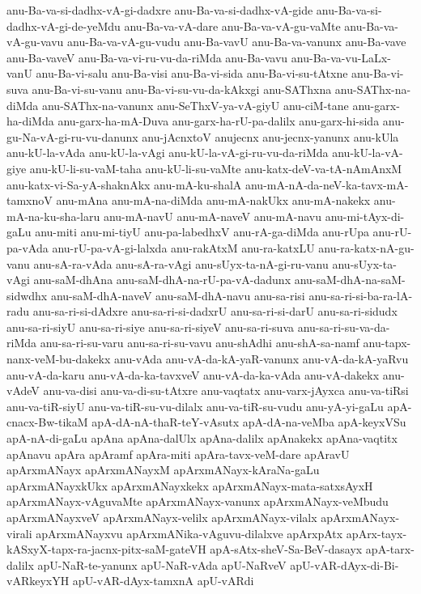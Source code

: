 {anu-Ba-va-si-dadhx-vA-gi-dadxre
anu-Ba-va-si-dadhx-vA-gide
anu-Ba-va-si-dadhx-vA-gi-de-yeMdu
anu-Ba-va-vA-dare
anu-Ba-va-vA-gu-vaMte
anu-Ba-va-vA-gu-vavu
anu-Ba-va-vA-gu-vudu
anu-Ba-vavU
anu-Ba-va-vanunx
anu-Ba-vave
anu-Ba-vaveV
anu-Ba-va-vi-ru-vu-da-riMda
anu-Ba-vavu
anu-Ba-va-vu-LaLx-vanU
anu-Ba-vi-salu
anu-Ba-visi
anu-Ba-vi-sida
anu-Ba-vi-su-tAtxne
anu-Ba-vi-suva
anu-Ba-vi-su-vanu
anu-Ba-vi-su-vu-da-kAkxgi
anu-SAThxna
anu-SAThx-na-diMda
anu-SAThx-na-vanunx
anu-SeThxV-ya-vA-giyU
anu-ciM-tane
anu-garx-ha-diMda
anu-garx-ha-mA-Duva
anu-garx-ha-rU-pa-dalilx
anu-garx-hi-sida
anu-gu-Na-vA-gi-ru-vu-danunx
anu-jAcnxtoV
anujecnx
anu-jecnx-yanunx
anu-kUla
anu-kU-la-vAda
anu-kU-la-vAgi
anu-kU-la-vA-gi-ru-vu-da-riMda
anu-kU-la-vA-giye
anu-kU-li-su-vaM-taha
anu-kU-li-su-vaMte
anu-katx-deV-va-tA-nAmAnxM
anu-katx-vi-Sa-yA-shaknAkx
anu-mA-ku-shalA
anu-mA-nA-da-neV-ka-tavx-mA-tamxnoV
anu-mAna
anu-mA-na-diMda
anu-mA-nakUkx
anu-mA-nakekx
anu-mA-na-ku-sha-laru
anu-mA-navU
anu-mA-naveV
anu-mA-navu
anu-mi-tAyx-di-gaLu
anu-miti
anu-mi-tiyU
anu-pa-labedhxV
anu-rA-ga-diMda
anu-rUpa
anu-rU-pa-vAda
anu-rU-pa-vA-gi-lalxda
anu-rakAtxM
anu-ra-katxLU
anu-ra-katx-nA-gu-vanu
anu-sA-ra-vAda
anu-sA-ra-vAgi
anu-sUyx-ta-nA-gi-ru-vanu
anu-sUyx-ta-vAgi
anu-saM-dhAna
anu-saM-dhA-na-rU-pa-vA-dadunx
anu-saM-dhA-na-saM-sidwdhx
anu-saM-dhA-naveV
anu-saM-dhA-navu
anu-sa-risi
anu-sa-ri-si-ba-ra-lA-radu
anu-sa-ri-si-dAdxre
anu-sa-ri-si-dadxrU
anu-sa-ri-si-darU
anu-sa-ri-sidudx
anu-sa-ri-siyU
anu-sa-ri-siye
anu-sa-ri-siyeV
anu-sa-ri-suva
anu-sa-ri-su-va-da-riMda
anu-sa-ri-su-varu
anu-sa-ri-su-vavu
anu-shAdhi
anu-shA-sa-namf
anu-tapx-nanx-veM-bu-dakekx
anu-vAda
anu-vA-da-kA-yaR-vanunx
anu-vA-da-kA-yaRvu
anu-vA-da-karu
anu-vA-da-ka-tavxveV
anu-vA-da-ka-vAda
anu-vA-dakekx
anu-vAdeV
anu-va-disi
anu-va-di-su-tAtxre
anu-vaqtatx
anu-varx-jAyxca
anu-va-tiRsi
anu-va-tiR-siyU
anu-va-tiR-su-vu-dilalx
anu-va-tiR-su-vudu
anu-yA-yi-gaLu
apA-cnacx-Bw-tikaM
apA-dA-nA-thaR-teY-vAsutx
apA-dA-na-veMba
apA-keyxVSu
apA-nA-di-gaLu
apAna
apAna-dalUlx
apAna-dalilx
apAnakekx
apAna-vaqtitx
apAnavu
apAra
apAramf
apAra-miti
apAra-tavx-veM-dare
apAravU
apArxmANayx
apArxmANayxM
apArxmANayx-kAraNa-gaLu
apArxmANayxkUkx
apArxmANayxkekx
apArxmANayx-mata-satxsAyxH
apArxmANayx-vAguvaMte
apArxmANayx-vanunx
apArxmANayx-veMbudu
apArxmANayxveV
apArxmANayx-velilx
apArxmANayx-vilalx
apArxmANayx-virali
apArxmANayxvu
apArxmANika-vAguvu-dilalxve
apArxpAtx
apArx-tayx-kASxyX-tapx-ra-jacnx-pitx-saM-gateVH
apA-sAtx-sheV-Sa-BeV-dasayx
apA-tarx-dalilx
apU-NaR-te-yanunx
apU-NaR-vAda
apU-NaRveV
apU-vAR-dAyx-di-Bi-vARkeyxYH
apU-vAR-dAyx-tamxnA
apU-vARdi
}
